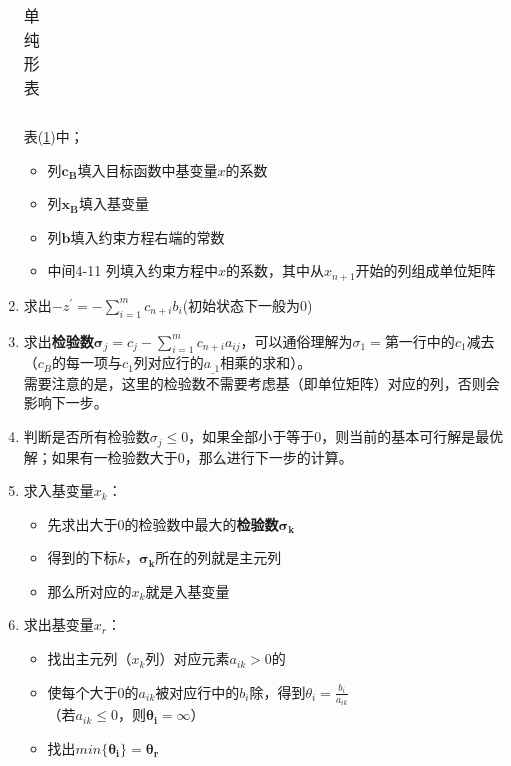 \documentclass{book}
\begin{document}
\begin{enumerate}
\begin{table}[ht]
\begin{tabular}{c|c|c|cccccccc|c}
                  \hline
              \end{tabular}
              \caption{单纯形表}
              \label{tab:label de SM}
          \end{table}
          表(\ref{tab:label de SM})中；
          \begin{itemize}
              \item 列$\boldsymbol{c_B}$填入目标函数中基变量$x$的系数
              \item 列$\boldsymbol{x_B}$填入基变量
              \item 列$\boldsymbol{b}$填入约束方程右端的常数
              \item 中间4-11 列填入约束方程中$x$的系数，其中从$x_{n+1}$开始的列组成单位矩阵
          \end{itemize}
    \item 求出$-z^{\prime}=-\sum\limits_{i=1}^mc_{n+i}b_i$(初始状态下一般为0)
    \item 求出\textbf{检验数}$\boldsymbol{\sigma}_j=c_j-\sum\limits_{i=1}^mc_{n+i}a_{ij}$，可以通俗理解为$\sigma_1=$第一行中的$c_1$减去（$c_B$的每一项与$c_1$列对应行的$a_{\_1}$相乘的求和）。\\
          需要注意的是，这里的检验数不需要考虑基（即单位矩阵）对应的列，否则会影响下一步。
    \item 判断是否所有检验数$\sigma_j\le0$，如果全部小于等于0，则当前的基本可行解是最优解；如果有一检验数大于0，那么进行下一步的计算。
    \item 求入基变量$x_k$：
          \begin{itemize}
              \item 先求出大于0的检验数中最大的\textbf{检验数}$\boldsymbol{\sigma_k}$
              \item 得到的下标$k$，$\boldsymbol{\sigma_k}$所在的列就是主元列
              \item 那么所对应的$x_k$就是入基变量
          \end{itemize}
    \item 求出基变量$x_r$：
          \begin{itemize}
              \item 找出主元列（$x_k$列）对应元素$a_{ik}>0$的
              \item 使每个大于0的$a_{ik}$被对应行中的$b_i$除，得到$\theta_i=\frac{b_i}{a_{ik}}$\\
                    （若$a_{ik}\le0$，则$\boldsymbol{\theta_i}=\infty$）
              \item 找出$min\{\boldsymbol{\theta_i}\}=\boldsymbol{\theta_r}$

\end{itemize}
\end{enumerate}
\end{document}

